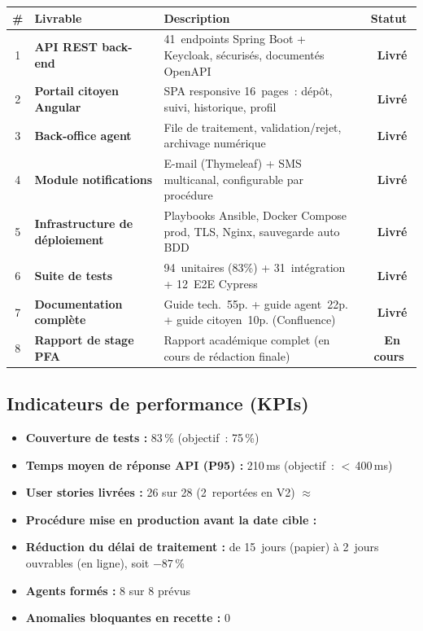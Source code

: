 \documentclass[a4paper,11pt]{article}
\newcommand{\done}{\textcolor{GreenOk}{\bfseries\sffamily\small \ding{51}\ Livr\'e}}
\newcommand{\wip}{\textcolor{OrangeWip}{\bfseries\sffamily\small \ding{109}\ En cours}}
\newcommand{\ok}{\textcolor{GreenOk}{\bfseries\ding{51}}}
\newcommand{\approxok}{\textcolor{OrangeWip}{\bfseries$\approx$}}
\begin{document}
\begin{center}
\renewcommand{\arraystretch}{1.4}
\begin{tabularx}{\textwidth}{c >{\sffamily\bfseries}l X c}
  \toprule
  \rowcolor{InstitBlue!10}
  \textbf{\#} & \textbf{Livrable} & \textbf{Description} & \textbf{Statut} \\
  \midrule
  1 & API REST back-end
    & 41~endpoints Spring Boot + Keycloak, s\'{e}curis\'{e}s, document\'{e}s OpenAPI
    & \done \\
  2 & Portail citoyen Angular
    & SPA responsive 16~pages~: d\'{e}p\^{o}t, suivi, historique, profil
    & \done \\
  3 & Back-office agent
    & File de traitement, validation/rejet, archivage num\'{e}rique
    & \done \\
  4 & Module notifications
    & E-mail (Thymeleaf) + SMS multicanal, configurable par proc\'{e}dure
    & \done \\
  5 & Infrastructure de d\'{e}ploiement
    & Playbooks Ansible, Docker Compose prod, TLS, Nginx, sauvegarde auto BDD
    & \done \\
  6 & Suite de tests
    & 94~unitaires (83\%) + 31~int\'{e}gration + 12~E2E Cypress
    & \done \\
  7 & Documentation compl\`{e}te
    & Guide tech.~55p. + guide agent~22p. + guide citoyen~10p. (Confluence)
    & \done \\
  8 & Rapport de stage PFA
    & Rapport acad\'{e}mique complet (en cours de r\'{e}daction finale)
    & \wip \\
  \bottomrule
\end{tabularx}
\end{center}

\vspace{0.8em}

\subsection{Indicateurs de performance (KPIs)}

\begin{itemize}
  \item \textbf{Couverture de tests :} 83\,\% (objectif~: 75\,\%) \ok
  \item \textbf{Temps moyen de r\'{e}ponse API (P95) :} 210\,ms (objectif~: $<$\,400\,ms) \ok
  \item \textbf{User stories livr\'{e}es :} 26 sur 28 (2~report\'{e}es en V2) \approxok
  \item \textbf{Proc\'{e}dure mise en production avant la date cible :} \ok
  \item \textbf{R\'{e}duction du d\'{e}lai de traitement :}
        de 15~jours (papier) \`{a} 2~jours ouvrables (en ligne), soit $-87\,\%$ \ok
  \item \textbf{Agents form\'{e}s :} 8 sur 8 pr\'{e}vus \ok
  \item \textbf{Anomalies bloquantes en recette :} 0 \ok
\end{itemize}
\end{document}
